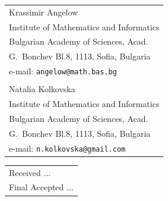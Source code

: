 \documentclass[leqno,11pt]{book}
\begin{document}
\bigskip
\noindent\sl
\begin{tabular}[b]{l}
Krassimir Angelow\\
Institute of Mathematics and Informatics\\
Bulgarian Academy of Sciences, Acad.\\
G.~Bonchev Bl.8, 1113, Sofia,
Bulgaria\\
e-mail: \texttt{angelow@math.bas.bg}\\
\\
Natalia Kolkovska\\
Institute of Mathematics and Informatics\\
Bulgarian Academy of Sciences, Acad.\\
G.~Bonchev Bl.8, 1113, Sofia,
Bulgaria\\
e-mail: \texttt{n.kolkovska@gmail.com}
\end{tabular}
\hfill
\begin{tabular}[b]{l}
Received ...\\
Final Accepted ...
\end{tabular}
\end{document}
